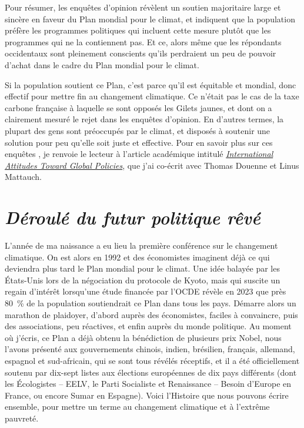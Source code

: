 \documentclass[a5paper,french,openany]{memoir}
\begin{document}
Pour résumer, les enquêtes d'opinion révèlent un soutien majoritaire large et sincère en faveur du Plan mondial pour le climat, et indiquent que la population préfère les programmes politiques qui incluent cette mesure plutôt que les programmes qui ne la contiennent pas. Et ce, alors même que les répondants occidentaux sont pleinement conscients qu'ils perdraient un peu de pouvoir d'achat dans le cadre du Plan mondial pour le climat. 

Si la population soutient ce Plan, c'est parce qu'il est équitable et mondial, donc effectif pour mettre fin au changement climatique. Ce n'était pas le cas de la taxe carbone française à laquelle se sont opposés les Gilets jaunes, et dont on a clairement mesuré le rejet dans les enquêtes d'opinion. En d'autres termes, la plupart des gens sont préoccupés par le climat, et disposés à soutenir une solution pour peu qu'elle soit juste et effective. 
Pour en savoir plus sur ces enquêtes%
, je renvoie le lecteur à l'article académique intitulé \href{https://papers.ssrn.com/sol3/papers.cfm?abstract_id=4448523}{\textit{International Attitudes Toward Global Policies}}, que j'ai co-écrit avec Thomas Douenne et Linus Mattauch. 

\chapter*{\textit{Déroulé du futur politique rêvé}}\label{ch:narr_reve}

L'année de ma naissance a eu lieu la première conférence sur le changement climatique. On est alors en 1992 et des économistes imaginent déjà ce qui deviendra plus tard le Plan mondial pour le climat. Une idée balayée par les États-Unis lors de la négociation du protocole de Kyoto, mais qui suscite un regain d'intérêt lorsqu'une étude financée par l'OCDE révèle en 2023 que près 80~\% de la population soutiendrait ce Plan dans tous les pays. Démarre alors un marathon de plaidoyer, d'abord auprès des économistes, faciles à convaincre, puis des associations, peu réactives, 
et enfin auprès du monde politique. Au moment où j'écris, ce Plan a déjà obtenu la bénédiction de plusieurs prix Nobel, nous l'avons présenté aux gouvernements chinois, indien, brésilien, français, allemand, espagnol et sud-africain, qui se sont tous révélés réceptifs, %
et il a été officiellement soutenu par dix-sept listes aux élections européennes de dix pays différents (dont les Écologistes -- EELV, le Parti Socialiste et Renaissance -- Besoin d'Europe en France, ou encore Sumar en Espagne). 
Voici l'Histoire que nous pouvons écrire ensemble, pour mettre un terme au changement climatique et à l'extrême pauvreté. 
\end{document}
